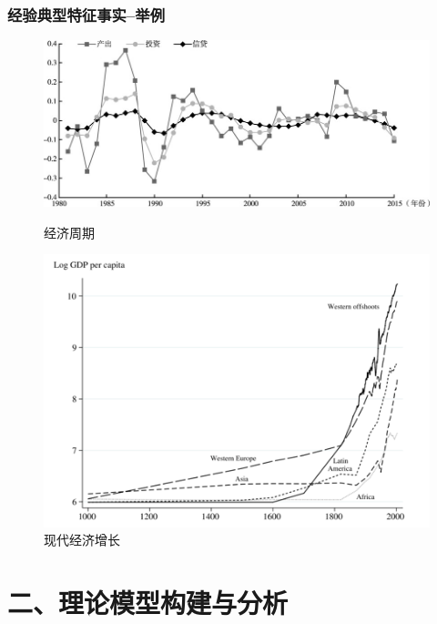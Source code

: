 \documentclass[aspectratio=169, 12pt]{beamer}
\begin{document}
\begin{frame}[plain]
    \frametitle{经验典型特征事实--举例}
    \begin{figure}
        \centering
        \begin{minipage}[t]{0.5\linewidth}
            \centering
            \includegraphics[width=1.0\textwidth]{./resources/figure/ecoperiod.jpg}
            \caption{经济周期}
            \label{fig:ver_2figs_2cap_1}
        \end{minipage}%
        \begin{minipage}[t]{0.5\linewidth}
            \centering
            \includegraphics[width=1.0\textwidth]{./resources/figure/growth.png}
            \caption{现代经济增长}
            \label{fig:ver_2figs_2cap_2}
        \end{minipage}
    \end{figure}
\end{frame}

\section{二、理论模型构建与分析}
\end{document}
